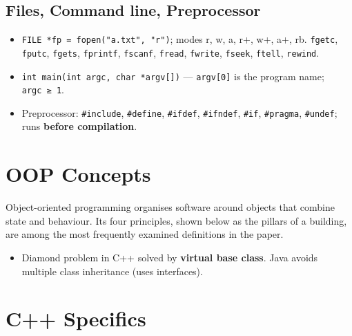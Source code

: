 \endgroup

\needspace{95pt}

\hypertarget{p2-03--26-files-command-line-preprocessor}{%
\subsection{Files, Command line, Preprocessor}\label{p2-03--26-files-command-line-preprocessor}}

\begin{itemize}
\tightlist
\item
  \texttt{FILE\ *fp\ =\ fopen("a.txt",\ "r")}; modes r, w, a, r+, w+, a+, rb. \texttt{fgetc}, \texttt{fputc}, \texttt{fgets}, \texttt{fprintf}, \texttt{fscanf}, \texttt{fread}, \texttt{fwrite}, \texttt{fseek}, \texttt{ftell}, \texttt{rewind}.
\item
  \texttt{int\ main(int\ argc,\ char\ *argv{[}{]})} --- \texttt{argv{[}0{]}} is the program name; \texttt{argc\ ≥\ 1}.
\item
  Preprocessor: \texttt{\#include}, \texttt{\#define}, \texttt{\#ifdef}, \texttt{\#ifndef}, \texttt{\#if}, \texttt{\#pragma}, \texttt{\#undef}; runs \textbf{before compilation}.
\end{itemize}

\needspace{125pt}

\hypertarget{p2-03--3-oop-concepts}{%
\section{OOP Concepts}\label{p2-03--3-oop-concepts}}

Object-oriented programming organises software around objects that combine state and behaviour. Its four
principles, shown below as the pillars of a building, are among the most frequently examined definitions in
the paper.





\begin{itemize}
\tightlist
\item
  Diamond problem in C++ solved by \textbf{virtual base class}. Java avoids multiple class inheritance (uses interfaces).
\end{itemize}

\needspace{130pt}

\hypertarget{p2-03--4-c-specifics}{%
\section{C++ Specifics}\label{p2-03--4-c-specifics}}

